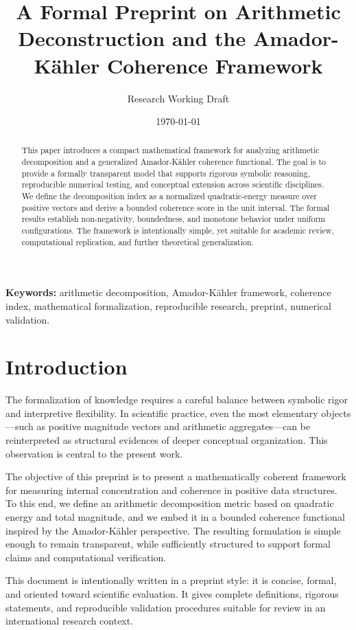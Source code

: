 \documentclass[11pt]{article}
\title{A Formal Preprint on Arithmetic Deconstruction and the Amador-Kähler Coherence Framework}
\author{Research Working Draft}
\date{\today}
\begin{document}
\maketitle

\begin{abstract}
This paper introduces a compact mathematical framework for analyzing arithmetic decomposition and a generalized Amador-Kähler coherence functional. The goal is to provide a formally transparent model that supports rigorous symbolic reasoning, reproducible numerical testing, and conceptual extension across scientific disciplines. We define the decomposition index as a normalized quadratic-energy measure over positive vectors and derive a bounded coherence score in the unit interval. The formal results establish non-negativity, boundedness, and monotone behavior under uniform configurations. The framework is intentionally simple, yet suitable for academic review, computational replication, and further theoretical generalization.
\end{abstract}

\noindent\textbf{Keywords:} arithmetic decomposition, Amador-Kähler framework, coherence index, mathematical formalization, reproducible research, preprint, numerical validation.

\section{Introduction}
The formalization of knowledge requires a careful balance between symbolic rigor and interpretive flexibility. In scientific practice, even the most elementary objects—such as positive magnitude vectors and arithmetic aggregates—can be reinterpreted as structural evidences of deeper conceptual organization. This observation is central to the present work.

The objective of this preprint is to present a mathematically coherent framework for measuring internal concentration and coherence in positive data structures. To this end, we define an arithmetic decomposition metric based on quadratic energy and total magnitude, and we embed it in a bounded coherence functional inspired by the Amador-Kähler perspective. The resulting formulation is simple enough to remain transparent, while sufficiently structured to support formal claims and computational verification.

This document is intentionally written in a preprint style: it is concise, formal, and oriented toward scientific evaluation. It gives complete definitions, rigorous statements, and reproducible validation procedures suitable for review in an international research context.
\end{document}
